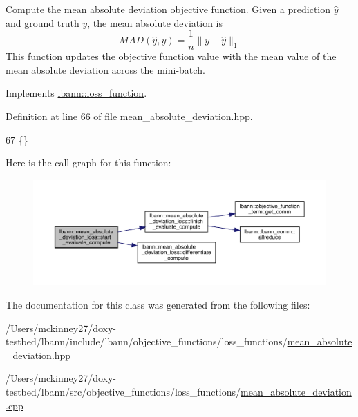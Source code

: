 Compute the mean absolute deviation objective function. Given a prediction $\hat{y}$ and ground truth $y$, the mean absolute deviation is \[ MAD(\hat{y}, y) = \frac{1}{n} \lVert y - \hat{y} \rVert_1 \] This function updates the objective function value with the mean value of the mean absolute deviation across the mini-\/batch. 

Implements \hyperlink{classlbann_1_1loss__function_a0bbe41060d788dc7a29f3737761a6f7d}{lbann\+::loss\+\_\+function}.



Definition at line 66 of file mean\+\_\+absolute\+\_\+deviation.\+hpp.


\begin{DoxyCode}
67                                                                        \{\}
\end{DoxyCode}
Here is the call graph for this function\+:\nopagebreak
\begin{figure}[H]
\begin{center}
\leavevmode
\includegraphics[width=350pt]{classlbann_1_1mean__absolute__deviation__loss_a4e4340e4370b824c56b76ed59e2ba879_cgraph}
\end{center}
\end{figure}


The documentation for this class was generated from the following files\+:\begin{DoxyCompactItemize}
\item 
/\+Users/mckinney27/doxy-\/testbed/lbann/include/lbann/objective\+\_\+functions/loss\+\_\+functions/\hyperlink{objective__functions_2loss__functions_2mean__absolute__deviation_8hpp}{mean\+\_\+absolute\+\_\+deviation.\+hpp}\item 
/\+Users/mckinney27/doxy-\/testbed/lbann/src/objective\+\_\+functions/loss\+\_\+functions/\hyperlink{objective__functions_2loss__functions_2mean__absolute__deviation_8cpp}{mean\+\_\+absolute\+\_\+deviation.\+cpp}\end{DoxyCompactItemize}
